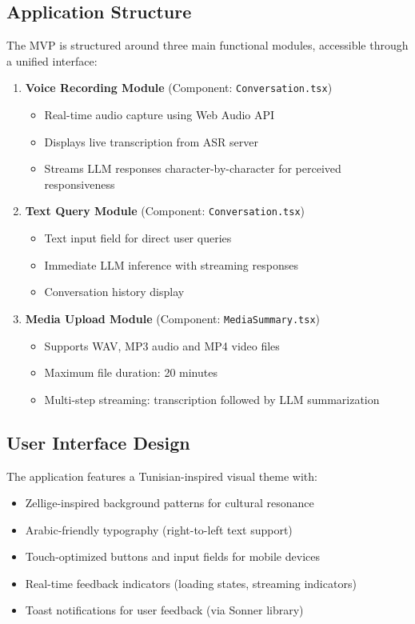 \documentclass[12pt,a4paper]{report}
\begin{document}
\subsection{Application Structure}

The MVP is structured around three main functional modules, accessible through a unified interface:

\begin{enumerate}
    \item \textbf{Voice Recording Module} (Component: \texttt{Conversation.tsx})
    \begin{itemize}
        \item Real-time audio capture using Web Audio API
        \item Displays live transcription from ASR server
        \item Streams LLM responses character-by-character for perceived responsiveness
    \end{itemize}
    \item \textbf{Text Query Module} (Component: \texttt{Conversation.tsx})
    \begin{itemize}
        \item Text input field for direct user queries
        \item Immediate LLM inference with streaming responses
        \item Conversation history display
    \end{itemize}
    \item \textbf{Media Upload Module} (Component: \texttt{MediaSummary.tsx})
    \begin{itemize}
        \item Supports WAV, MP3 audio and MP4 video files
        \item Maximum file duration: 20 minutes
        \item Multi-step streaming: transcription followed by LLM summarization
    \end{itemize}
\end{enumerate}

\subsection{User Interface Design}

The application features a Tunisian-inspired visual theme with:
\begin{itemize}
    \item Zellige-inspired background patterns for cultural resonance
    \item Arabic-friendly typography (right-to-left text support)
    \item Touch-optimized buttons and input fields for mobile devices
    \item Real-time feedback indicators (loading states, streaming indicators)
    \item Toast notifications for user feedback (via Sonner library)
\end{itemize}
\end{document}

